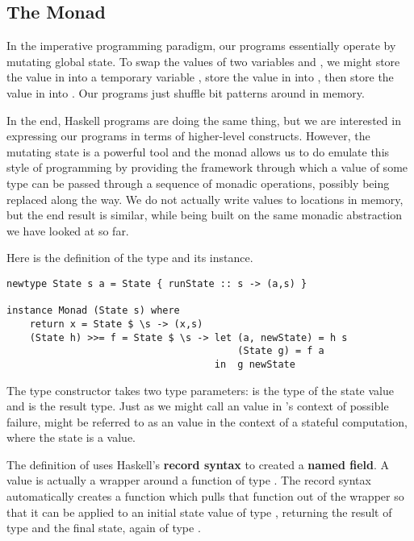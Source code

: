 \subsection{The  Monad}

In the imperative programming paradigm, our programs essentially operate by mutating global state. To swap the values of two variables 
 and , we might store the value in  into a temporary variable , store the value in  into ,
then store the value in  into . Our programs just shuffle bit patterns around in memory.

In the end, Haskell programs are doing the same thing, but we are interested in expressing our programs in terms of higher-level 
constructs. However, the mutating state is a powerful tool and the  monad allows us to do emulate this style of
programming by providing the framework through which a value of some type can be passed through a sequence of monadic operations,
possibly being replaced along the way. We do not actually write values to locations in memory, but the end result is similar, while
being built on the same monadic abstraction we have looked at so far.

Here is the definition of the  type and its  instance.

\begin{lstlisting}
newtype State s a = State { runState :: s -> (a,s) }  

instance Monad (State s) where  
    return x = State $ \s -> (x,s)  
    (State h) >>= f = State $ \s -> let (a, newState) = h s  
                                        (State g) = f a  
                                    in  g newState 
\end{lstlisting}

The  type constructor takes two type parameters:  is the type of the state value and  is
the result type. Just as we might call  an  value in 's context of possible
failure,  might be referred to as an  value in the context of a stateful
computation, where the state is a  value.

The  definition of  uses Haskell's \textbf{record syntax} to created a \textbf{named field}.
A  value is actually a wrapper around a function of type . The record syntax automatically
creates a function  which pulls that function out of the wrapper so that it can be applied to an initial
state value of type , returning the result of type  and the final state, again of type .

